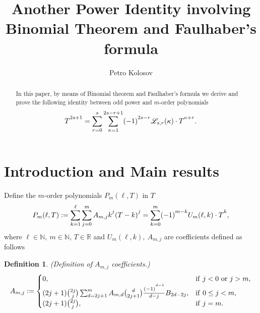 \documentclass[11pt, letterpaper]{amsart}
\author[Petro Kolosov]{Petro Kolosov}
\title{Another Power Identity involving Binomial Theorem and Faulhaber's formula}
\theoremstyle{definition}
\newtheorem{defn}[thm]{Definition}
\theoremstyle{remark}
\numberwithin{equation}{section}
\begin{document}
\begin{abstract}
In this paper, by means of Binomial theorem and Faulhaber's formula we derive and prove the following identity
between odd power and $m$-order polynomials
$$T\strut^{2s+1}=\sum_{r=0}^{s}\sum_{\kappa=1}^{2s-r+1} (-1)\strut^{2s-r} \mathscr{L}_{s,r}(\kappa) \cdot T\strut^{\kappa+r}.$$
\end{abstract}
\maketitle
\tableofcontents
\section{Introduction and Main results}\label{intro}
Define the $m$-order polynomials $P_m(\ell,T)$ in $T$
\begin{equation}\label{f1}
P_m(\ell,T) := \sum_{k=1}^{\ell}\sum_{j=0}^m A_{m,j}k\strut^j(T-k)\strut^j=\sum_{k=0}^{m}(-1)\strut^{m-k}U_m(\ell, k)\cdot T\strut^k,
\end{equation}
where $\ell\in\mathbb{N}, \ m\in\mathbb{N}$, $T\in\mathbb{R}$ and $U_m(\ell, k), \ A_{m,j}$ are coefficients defined as follows
\begin{defn}\label{gen_13}
\textit{(Definition of $A_{m,j}$ coefficients.)}
\begin{equation*}
A_{m,j}:=
\begin{cases}
0, & \mathrm{if } \ j<0 \ \mathrm{or } \ j>m, \\
(2j+1)\binom{2j}{j} \sum_{d=2j+1}^{m} A_{m,d} \binom{d}{2j+1} \frac{(-1)\strut^{d-1}}{d-j} B_{2d-2j}, & \mathrm{if } \ 0 \leq j < m, \\
(2j+1)\binom{2j}{j}, & \mathrm{if } \ j=m. \\
\end{cases}
\end{equation*}
\end{defn}
\end{document}
